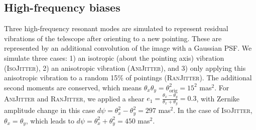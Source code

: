 \documentclass[usenatbib]{mnras}
\begin{document}
\subsection{High-frequency biases}\label{sec:low}

Three high-frequency resonant modes are simulated to represent residual vibrations of the telescope after orienting to a new pointing. 
These are represented by an additional convolution of the image with a Gaussian PSF. We simulate three cases: 1) an isotropic (about the pointing axis) vibration  (\textsc{IsoJitter}), 2) an anisotropic vibration (\textsc{AniJitter}), and 3) only applying this anisotropic vibration to a random 15\% of pointings (\textsc{RanJitter}). 
The additional second moments are conserved, which means $\theta_x\theta_y=\theta_{\mathrm{orig}}^2=15^2$ mas$^2$. 
For \textsc{AniJitter} and \textsc{RanJitter}, we applied a shear $e_1=\frac{\theta_x-\theta_y}{\theta_x+\theta_y}=0.3$,  with Zernike amplitude change in this case  $d\psi=\theta_x^2-\theta_y^2=297$ mas$^2$. 
In the case of \textsc{IsoJitter}, $\theta_x=\theta_y$, which leads to $d\psi=\theta_x^2+\theta_y^2=450$ mas$^2$.
\end{document}
